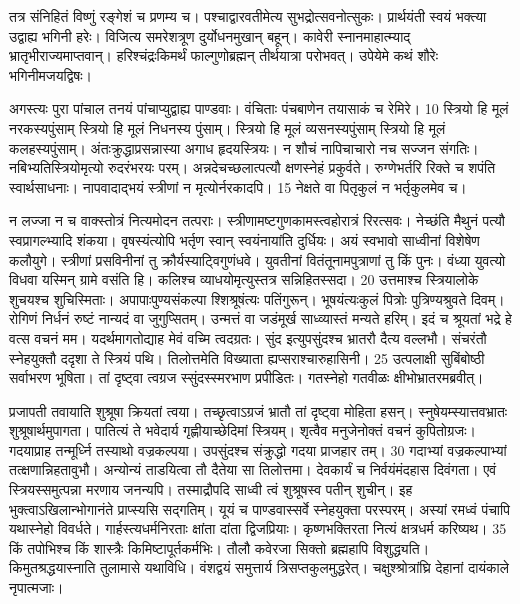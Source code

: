 तत्र संनिहितं विष्णुं रङ्गेशं च प्रणम्य च।
 पश्चाद्वारवतीमेत्य सुभद्रोत्सवनोत्सुकः।
 प्रार्थयंती स्वयं भक्त्या उद्वाह्य भगिनी हरेः।
 विजित्य समरेशत्रूण दुर्योधनमुखान् बहून्।
 कावेरी स्नानमाहात्म्याद् भ्रातृभीराज्यमाप्तवान्।
 हरिश्चंद्रःकिमर्थं फाल्गुणोब्रह्मन् तीर्थयात्रा परोभवत्।
 उपेयेमे कथं शौरेः भगिनीमजयद्विषः।
 
अगस्त्यः
पुरा पांचाल तनयं पांचाप्युद्वाह्य पाण्डवाः।
 वंचिताः पंचबाणेन तयासाकं च रेमिरे।
 10 स्त्रियो हि मूलं नरकस्यपुंसाम् स्त्रियो
हि मूलं निधनस्य पुंसाम्।
 स्त्रियो हि मूलं व्यसनस्यपुंसाम् स्त्रियो
हि मूलं कलहस्यपुंसाम्।
 अंतःक्रुद्धाप्रसन्नास्या अगाध हृदयस्त्रियः।
 न शौचं नापिचाचारो नच सज्जन संगतिः।
 नबिभ्यतिस्त्रियोमृत्यो रुदरंभरयः परम्।
 अन्नदेचच्छलात्पत्यौ क्षणस्नेहं प्रकुर्वते।
 रुग्णेभर्तरि रिक्ते च शपंति स्वार्थसाधनाः।
 नापवादाद्भयं स्त्रीणां न मृत्योर्नरकादपि।
 15 नेक्षते वा पितृकुलं न भर्तृकुलमेव च।
 
न लज्जा न च वाक्स्तोत्रं नित्यमोदन तत्पराः।
 स्त्रीणामष्टगुणकामस्त्वहोरात्रं रिरत्सवः।
 नेच्छंति मैथुनं पत्यौ स्वप्रागल्भ्यादि शंकया।
 वृषस्यंत्योपि भर्तृण स्वान् स्वयंनायांति दुर्धियः।
 अयं स्वभावो साध्वीनां विशेषेण कलौयुगे।
 स्त्रीणां प्रसविनीनां तु क्रौर्यस्याट्विगुणंधवे।
 युवतीनां वितंतूनामपुत्राणां तु किं पुनः।
 वंध्या युवत्यो विधवा यस्मिन् ग्रामे वसंति हि।
 कलिश्च व्याधयोमृत्युस्तत्र सन्निहितस्सदा।
 20 उत्तमाश्च स्त्रियालोके शुचयश्च शुचिस्मिताः।
 अपापाःपुण्यसंकल्पा श्शिश्रूषंत्यः पतिंगुरून्।
 भूषयंत्यःकुलं पित्रोः पुत्रिण्यश्रुवते दिवम्।
 रोगिणं निर्धनं रुष्टं नान्यदं वा जुगुप्सितम्।
 उन्मत्तं वा जडंमूर्ख साध्व्यास्तं मन्यते हरिम्।
 इदं च श्रूयतां भद्रे हे वत्स वचनं मम।
 यदर्थमागतोद्याह मेवं वच्मि त्वदग्रतः।
 सुंद इत्युपसुंदश्च भ्रातरौ दैत्य वल्लभौ।
 संचरंतौ स्नेहयुक्तौ ददृशा ते स्त्रियं पथि।
 तिलोत्तमेति विख्याता ह्यप्सराश्चारुहासिनी।
 25 उत्पलाक्षी सुबिंबोष्ठी सर्वाभरण भूषिता।
 तां दृष्ट्वा त्वग्रज स्सुंदस्स्मरभाण प्रपीडितः।
 गतस्नेहो गतवीळः क्षीभोभ्रातरमब्रवीत्।
 
प्रजापती तवायाति शुश्रूषा क्रियतां त्वया।
 तच्छृत्वाऽग्रजं भ्रातौ तां दृष्ट्वा मोहिता हसन्।
 स्नुषेयम्स्यात्तवभ्रातः शुश्रूषार्थमुपागता।
 पातित्यं ते भवेदार्य गृह्णीयाच्छेदिमां स्त्रियम्।
 शृत्वैव मनुजेनोक्तं वचनं कुपितोग्रजः।
 गदयाप्राह तन्मूर्ध्नि तस्याथो वज्रकल्पया।
 उपसुंदश्च संक्रुद्धो गदया प्राजहार तम्।
 30 गदाभ्यां वज्रकल्पाभ्यां तत्क्षणान्निहतावुभौ।
 अन्योन्यं ताडयित्वा तौ दैतेया सा तिलोत्तमा।
 देवकार्यं च निर्वयंमंदहास दिवंगता।
 एवं स्त्रियस्समुत्पन्ना मरणाय जनन्यपि।
 तस्माद्रौपदि साध्वी त्वं शुश्रूषस्व पतीन् शुचीन्।
 इह भुक्त्वाऽखिलान्भोगानंते प्राप्स्यसि सद्गतिम्।
 यूयं च पाण्डवास्सर्वे स्नेहयुक्ता परस्परम्।
 अस्यां रमध्वं पंचापि यथास्नेहो विवर्धते।
 गार्हस्त्यधर्मनिरताः क्षांता दांता द्विजप्रियाः।
 कृष्णभक्तिरता नित्यं क्षत्रधर्म करिष्यथ।
 35 किं तपोभिश्च किं शास्त्रैः किमिष्टापूर्तकर्मभिः।
 तौलौ कवेरजा सिक्तो ब्रह्महापि विशुद्ध्यति।
 किमुतश्रद्धयास्नाति तुलामासे यथाविधि।
 वंशद्वयं समुत्तार्य त्रिसप्तकुलमुद्धरेत्।
 चक्षुश्श्रोत्रांघ्रि देहानां दायंकाले नृपात्मजाः।
 
